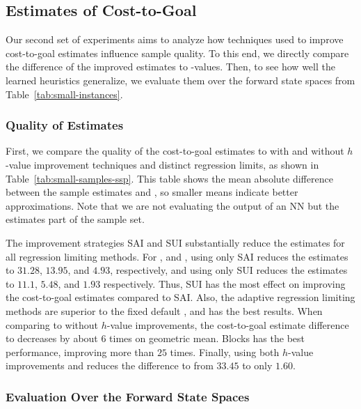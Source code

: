 

\subsection{Estimates of Cost-to-Goal}

Our second set of experiments aims to analyze how techniques used to improve cost-to-goal estimates influence sample quality. To this end, we directly compare the difference of the improved estimates to \hstar-values. Then, to see how well the learned heuristics generalize, we evaluate them over the forward state spaces from Table~\ref{tab:small-instances}.

\subsubsection{Quality of Estimates}

First, we compare the quality of the cost-to-goal estimates to \hstar with and without $h$-value improvement techniques and distinct regression limits, as shown in Table~\ref{tab:small-samples-ssp}. This table shows the mean absolute difference between the sample estimates and \hstar, so smaller means indicate better approximations. Note that we are not evaluating the output of an NN but the estimates part of the sample set.



The improvement strategies SAI and SUI substantially reduce the estimates for all regression limiting methods. For , \facts and \meanfx, using only SAI reduces the estimates to $31.28$, $13.95$, and $4.93$, respectively, and using only SUI reduces the estimates to $11.1$, $5.48$, and $1.93$ respectively. Thus, SUI has the most effect on improving the cost-to-goal estimates compared to SAI.
Also, the adaptive regression limiting methods are superior to the fixed default , and \meanfx has the best results. When comparing  to \meanfx without $h$-value improvements, the cost-to-goal estimate difference to \hstar decreases by about $6$ times on geometric mean. Blocks has the best performance, improving more than $25$ times. Finally, using both $h$-value improvements and \meanfx reduces the difference to \hstar from $33.45$ to only $1.60$.

\subsubsection{Evaluation Over the Forward State Spaces}

